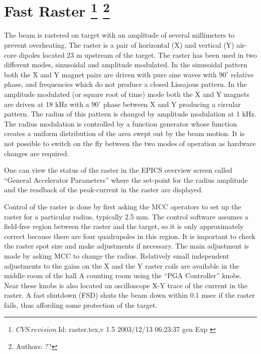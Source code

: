 \section[Fast Raster]{Fast Raster
\footnote{
  $CVS~revision~ $Id: raster.tex,v 1.5 2003/12/13 06:23:37 gen Exp $ $
}
\footnote{Authors: ?? }
}

The beam is rastered on target with an amplitude of
several millimeters to prevent overheating.  
The raster is a pair of horizontal (X) and vertical (Y)
air-core dipoles located 23 m upstream of the
target. The raster has been used in two different modes,
sinusoidal and amplitude modulated. In the sinusoidal pattern
both the X and Y magnet pairs are driven with pure sine waves
with $90^{\circ}$ relative phase, 
and frequencies which do not produce a closed Lissajous pattern.
In the amplitude modulated (or square root of time) mode  
both the X and Y magnets are driven at 18 kHz with
a $90^{\circ}$ phase between X and Y producing  a circular
pattern. The radius of this pattern is changed by amplitude
modulation at 1 kHz. The radius modulation
is controlled by a function generator whose function
creates a uniform distribution of the area swept out
by the beam motion. It is not possible to switch on the fly
between the two modes of operation as hardware changes are required.

One can view the status of the raster in the
EPICS overview screen called ``General Accelerator
Parameters'' where the set-point for the radius amplitude
and the readback of the peak-current in the raster are displayed.

Control of the raster is done by first asking the MCC
operators to set up the raster for a particular radius, 
typically 2.5 mm.
The control software assumes a field-free region between
the raster and the target, so it is only approximately
correct because there are four quadrupoles in this region.
It is important to check the raster spot size and
make adjustments if necessary.  The main adjustment is made
by asking MCC to change the radius.
Relatively small independent adjustments to the 
gains on the X and the Y raster
coils are available in the middle room of the hall A
counting room using the ``PGA Controller'' knobs.
Near these knobs is also located an oscilloscope X-Y trace
of the current in the raster.  A fast shutdown (FSD) shuts
the beam down within 0.1 msec if the raster fails, thus
affording some protection of the target.

